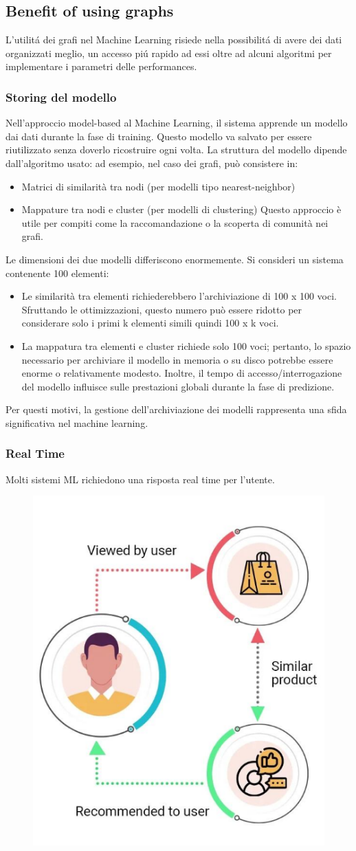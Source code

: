 \newpage

\subsection{Benefit of using graphs}
L'utilitá dei grafi nel Machine Learning risiede nella possibilitá di avere dei dati organizzati meglio, un accesso piú rapido ad essi oltre ad alcuni algoritmi per implementare i parametri delle performances. 

\subsubsection*{Storing del modello}
Nell’approccio model-based al Machine Learning, il sistema apprende un modello dai dati durante la fase di training. Questo modello va salvato per essere riutilizzato senza doverlo ricostruire ogni volta. La struttura del modello dipende dall’algoritmo usato: ad esempio, nel caso dei grafi, può consistere in:
\begin{itemize}
    \item Matrici di similarità tra nodi (per modelli tipo nearest-neighbor)
    \item Mappature tra nodi e cluster (per modelli di clustering)
Questo approccio è utile per compiti come la raccomandazione o la scoperta di comunità nei grafi.
\end{itemize} 
Le dimensioni dei due modelli differiscono enormemente. Si consideri un sistema contenente 100 elementi:
\begin{itemize}
    \item Le similarità tra elementi richiederebbero l'archiviazione di 100 x 100 voci. Sfruttando le ottimizzazioni, questo numero può essere ridotto per considerare solo i primi k elementi simili quindi 100 x k voci.
    \item La mappatura tra elementi e cluster richiede solo 100 voci; pertanto, lo spazio necessario per archiviare il modello in memoria o su disco potrebbe essere enorme o relativamente modesto. Inoltre, il tempo di accesso/interrogazione del modello influisce sulle prestazioni globali durante la fase di predizione.
\end{itemize}
Per questi motivi, la gestione dell'archiviazione dei modelli rappresenta una sfida significativa nel machine learning.

\subsubsection*{Real Time}
Molti sistemi ML richiedono una risposta real time per l'utente.
\\
\begin{figure}[th]
    \centering
    \includegraphics[width=0.20\linewidth]{ML&Graphs//img/recommendations.png}
\end{figure}
\\
